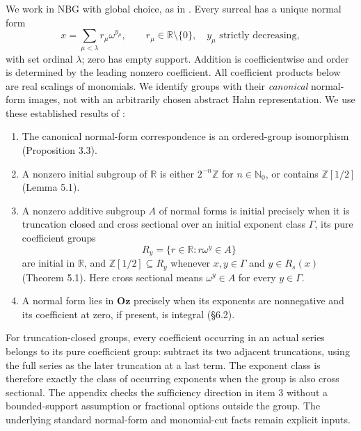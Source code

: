 \documentclass[11pt]{article}
\newcommand{\Oz}{\mathbf{Oz}}
\newcommand{\D}{\mathbb{Z}[1/2]}
\newcommand{\Z}{\mathbb{Z}}
\newcommand{\R}{\mathbb{R}}
\begin{document}
We work in NBG with global choice, as in \cite{ek}. Every surreal has a
unique normal form
\[
 x=\sum_{\mu<\lambda}r_\mu\omega^{y_\mu},
 \qquad r_\mu\in\R\setminus\{0\},\quad y_\mu\text{ strictly decreasing},
\]
with set ordinal $\lambda$; zero has empty support. Addition is
coefficientwise and order is determined by the leading nonzero coefficient.
All coefficient products below are real scalings of monomials.
We identify groups with their \emph{canonical} normal-form images,
not with an arbitrarily chosen abstract Hahn representation.
We use these established results of \cite{ek}:
\begin{enumerate}
\item The canonical normal-form correspondence is an ordered-group
isomorphism (Proposition 3.3).
\item A nonzero initial subgroup of $\R$ is either $2^{-n}\Z$ for
$n\in\mathbb{N}_0$, or contains $\D$ (Lemma 5.1).
\item A nonzero additive subgroup $A$ of normal forms is initial precisely
when it is truncation closed and cross sectional over an initial exponent
class $\Gamma$, its pure coefficient groups
\[
 R_y=\{r\in\R:r\omega^y\in A\}
\]
are initial in $\R$, and $\D\subseteq R_y$ whenever
$x,y\in\Gamma$ and $y\in R_s(x)$ (Theorem 5.1).
Here cross sectional means $\omega^y\in A$ for every $y\in\Gamma$.
\item A normal form lies in $\Oz$ precisely when its exponents are
nonnegative and its coefficient at zero, if present, is integral
(\S6.2).
\end{enumerate}
For truncation-closed groups, every coefficient occurring in an actual
series belongs to its pure coefficient group: subtract its two adjacent
truncations, using the full series as the later truncation at a last term.
The exponent class is therefore exactly the class of occurring exponents
when the group is also cross sectional.
The appendix checks the sufficiency direction in item 3 without
a bounded-support assumption or fractional options outside the group.
The underlying standard normal-form and monomial-cut facts remain
explicit inputs.
\end{document}
